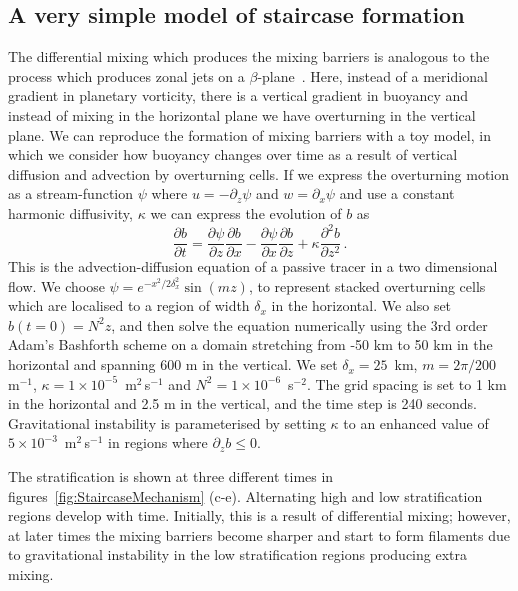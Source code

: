 \subsection{A very simple model of staircase formation}
The differential mixing which produces the mixing barriers is analogous to the process which produces zonal jets on a $\beta$-plane~\citep{Manfroi1999}. Here, instead of a meridional gradient in planetary vorticity, there is a vertical gradient in buoyancy and instead of mixing in the horizontal plane we have overturning in the vertical plane. We can reproduce the formation of mixing barriers with a toy model, in which we consider how buoyancy changes over time as a result of vertical diffusion and advection by overturning cells. If we express the overturning motion as a stream-function $\psi$ where $u = - \partial_z \psi$ and $w = \partial_x \psi$ and use a constant harmonic diffusivity, $\kappa$ we can express the evolution of $b$ as
\begin{equation}
    \frac{\partial b}{\partial t} = \frac{\partial \psi}{\partial z} \frac{\partial b}{\partial x} - \frac{\partial \psi}{\partial x} \frac{\partial b}{\partial z} + \kappa \frac{\partial^2 b}{\partial z^2} \, .
\end{equation}
This is the advection-diffusion equation of a passive tracer in a two dimensional flow. We choose $\psi = e^{- x^2 / 2\delta_x^2} \sin(m z)$, to represent stacked overturning cells which are localised to a region of width $\delta_x$ in the horizontal. We also set $b(t=0) = N^2 z$, and then solve the equation numerically using the 3rd order Adam's Bashforth scheme on a domain stretching from -50 km to 50 km in the horizontal and spanning 600 m in the vertical. We set $\delta_x = 25$~km, $m = 2 \pi / 200$ m$^{-1}$, $\kappa = 1 \times 10^{-5}$~m$^2$\,s$^{-1}$ and $N^2 = 1 \times 10^{-6}$~s$^{-2}$. The grid spacing is set to 1 km in the horizontal and 2.5 m in the vertical, and the time step is 240 seconds. Gravitational instability is parameterised by setting $\kappa$ to an enhanced value of $5 \times 10^{-3}$~m$^2$\,s$^{-1}$ in regions where $\partial_z b \leq 0$.

The stratification is shown at three different times in figures~\ref{fig:StaircaseMechanism} (c-e). Alternating high and low stratification regions develop with time. Initially, this is a result of differential mixing; however, at later times the mixing barriers become sharper and start to form filaments due to gravitational instability in the low stratification regions producing extra mixing.

